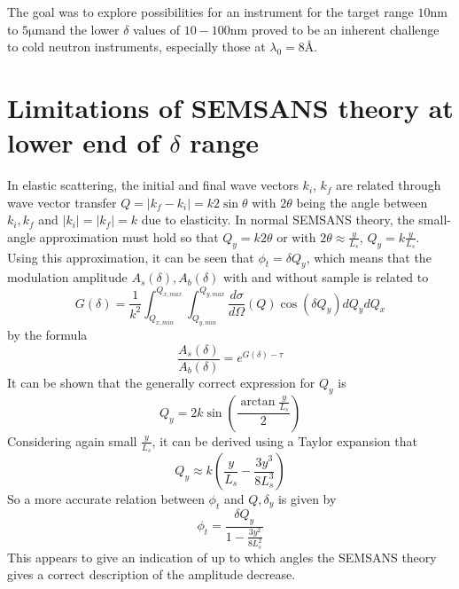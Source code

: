 \documentclass{article}
\newcommand{\targetrange}{$10 \unit{\nano\meter}$ to $5 \unit{\micro\meter}$}
\begin{document}
The goal was to explore possibilities for an instrument for the target range \targetrange and the lower $\delta$ values of $10 - 100 \unit{\nano\meter}$ proved to be an inherent challenge to cold neutron instruments, especially those at $\lambda_0 = 8$Å. 


\printbibliography

\appendix
\section{Limitations of SEMSANS theory at lower end of $\delta$ range}
\label{appendix-a}
In elastic scattering, the initial and final wave vectors $k_i$, $k_f$ are related through wave vector transfer $Q = |k_f - k_i| = k 2\sin\theta$ with $2\theta$ being the angle between $k_i, k_f$ and $|k_i| = |k_f| = k$ due to elasticity. In normal SEMSANS theory, the small-angle approximation must hold so that $Q_y = k2\theta$ or with $2\theta \approx \frac{y}{L_s}$, $Q_y = k\frac{y}{L_s}$. Using this approximation, it can be seen that $\phi_t = \delta Q_y$, which means that the modulation amplitude $A_s(\delta), A_b(\delta)$ with and without sample is related to
$$G(\delta) = \frac{1}{k^2}\int_{Q_{x,min}}^{Q_{x,max}}\int_{Q_{y,min}}^{Q_{y,max}}\dfrac{d\sigma}{d\Omega}(Q)\cos(\delta Q_y)dQ_ydQ_x$$
by the formula
$$\frac{A_s(\delta)}{A_b(\delta)} = e^{G(\delta) - \tau}$$
It can be shown that the generally correct expression for $Q_y$ is 
$$Q_y = 2k\sin(\frac{\arctan\frac{y}{L_s}}{2})$$
Considering again small $\frac{y}{L_s}$, it can be derived using a Taylor expansion that $$Q_y \approx  k(\frac{y}{L_s} - \frac{3y^3}{8L_s^3})$$ So a more accurate relation between $\phi_t$ and $Q, \delta_y$ is given by $$\phi_t = \frac{\delta Q_y}{1 - \frac{3y^2}{8L_s^2}}$$ This appears to give an indication of up to which angles the SEMSANS theory gives a correct description of the amplitude decrease.
\end{document}
